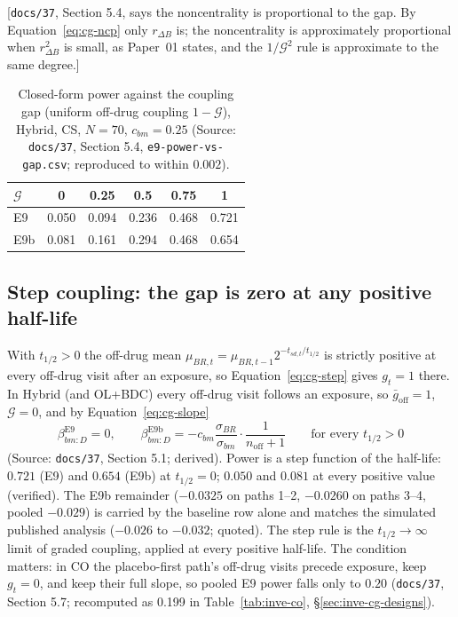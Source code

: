 \documentclass[11pt]{article}
\newcommand{\note}[1]{\textcolor{blue!60!black}{\small [#1]}}
\newcommand{\code}[1]{\texttt{#1}}
\begin{document}
\note{\code{docs/37}, Section 5.4, says the noncentrality is
proportional to the gap. By Equation~\eqref{eq:cg-ncp} only
$r_{\Delta B}$ is; the noncentrality is approximately proportional
when $r_{\Delta B}^2$ is small, as Paper~01 states, and the
$1/\mathcal G^2$ rule is approximate to the same degree.}

\begin{table}[h]
\centering\small
\caption{Closed-form power against the coupling gap (uniform off-drug
coupling $1 - \mathcal G$), Hybrid, CS, $N = 70$, $c_{bm} = 0.25$
(Source: \code{docs/37}, Section 5.4, \code{e9-power-vs-gap.csv};
reproduced to within $0.002$).}
\label{tab:cg-gap}
\begin{tabular}{@{}lccccc@{}}
\toprule
$\mathcal G$ & 0 & 0.25 & 0.5 & 0.75 & 1 \\
\midrule
E9  & 0.050 & 0.094 & 0.236 & 0.468 & 0.721 \\
E9b & 0.081 & 0.161 & 0.294 & 0.468 & 0.654 \\
\bottomrule
\end{tabular}
\end{table}

\subsection{Step coupling: the gap is zero at any positive half-life}
\label{sec:cg-step}

With $t_{1/2} > 0$ the off-drug mean
$\mu_{BR,t} = \mu_{BR,t-1}2^{-t_{sd,t}/t_{1/2}}$ is strictly positive
at every off-drug visit after an exposure, so
Equation~\eqref{eq:cg-step} gives $g_t = 1$ there. In Hybrid (and
OL+BDC) every off-drug visit follows an exposure, so
$\bar g_{\mathrm{off}} = 1$, $\mathcal G = 0$, and by
Equation~\eqref{eq:cg-slope}
\begin{equation}
\beta_{bm:D}^{\mathrm{E9}} = 0, \qquad
\beta_{bm:D}^{\mathrm{E9b}} = -c_{bm}\frac{\sigma_{BR}}{\sigma_{bm}}
  \cdot\frac{1}{n_{\mathrm{off}}+1}
  \qquad \text{for every } t_{1/2} > 0
\label{eq:cg-step-slope}
\end{equation}
(Source: \code{docs/37}, Section 5.1; derived). Power is a step
function of the half-life: $0.721$ (E9) and $0.654$ (E9b) at
$t_{1/2} = 0$; $0.050$ and $0.081$ at every positive value (verified).
The E9b remainder ($-0.0325$ on paths 1--2, $-0.0260$ on paths 3--4,
pooled $-0.029$) is carried by the baseline row alone and matches the
simulated published analysis ($-0.026$ to $-0.032$; quoted). The step
rule is the $t_{1/2}\to\infty$ limit of graded coupling, applied at
every positive half-life. The condition matters: in CO the
placebo-first path's off-drug visits precede exposure, keep $g_t = 0$,
and keep their full slope, so pooled E9 power falls only to $0.20$
(\code{docs/37}, Section 5.7; recomputed as 0.199 in
Table~\ref{tab:inve-co}, \S\ref{sec:inve-cg-designs}).
\end{document}
